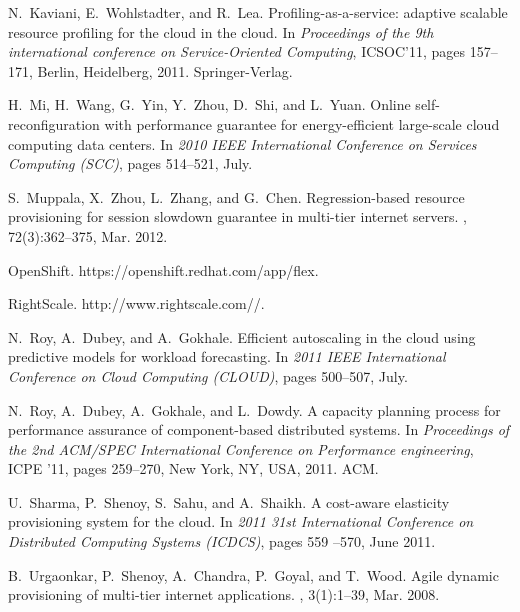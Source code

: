 \documentclass{sig-alternate-10pt}
\begin{document}
\begin{thebibliography}{10}
N.~Kaviani, E.~Wohlstadter, and R.~Lea.
\newblock Profiling-as-a-service: adaptive scalable resource profiling for the
  cloud in the cloud.
\newblock In {\em Proceedings of the 9th international conference on
  Service-Oriented Computing}, {ICSOC'11}, pages 157--171, Berlin, Heidelberg,
  2011. Springer-Verlag.

H.~Mi, H.~Wang, G.~Yin, Y.~Zhou, D.~Shi, and L.~Yuan.
\newblock Online self-reconfiguration with performance guarantee for
  energy-efficient large-scale cloud computing data centers.
\newblock In {\em 2010 {IEEE} International Conference on Services Computing
  ({SCC)}}, pages 514--521, July.

S.~Muppala, X.~Zhou, L.~Zhang, and G.~Chen.
\newblock Regression-based resource provisioning for session slowdown guarantee
  in multi-tier internet servers.
, 72(3):362--375,
  Mar. 2012.

{OpenShift. https://openshift.redhat.com/app/flex}.

{RightScale. http://www.rightscale.com//}.

N.~Roy, A.~Dubey, and A.~Gokhale.
\newblock Efficient autoscaling in the cloud using predictive models for
  workload forecasting.
\newblock In {\em 2011 {IEEE} International Conference on Cloud Computing
  ({CLOUD)}}, pages 500--507, July.

N.~Roy, A.~Dubey, A.~Gokhale, and L.~Dowdy.
\newblock A capacity planning process for performance assurance of
  component-based distributed systems.
\newblock In {\em Proceedings of the 2nd ACM/SPEC International Conference on
  Performance engineering}, ICPE '11, pages 259--270, New York, NY, USA, 2011.
  ACM.

U.~Sharma, P.~Shenoy, S.~Sahu, and A.~Shaikh.
\newblock A cost-aware elasticity provisioning system for the cloud.
\newblock In {\em 2011 31st International Conference on Distributed Computing
  Systems ({ICDCS)}}, pages 559 --570, June 2011.

B.~Urgaonkar, P.~Shenoy, A.~Chandra, P.~Goyal, and T.~Wood.
\newblock Agile dynamic provisioning of multi-tier internet applications.
, 3(1):1--39, Mar. 2008.


\end{thebibliography}
\end{document}
